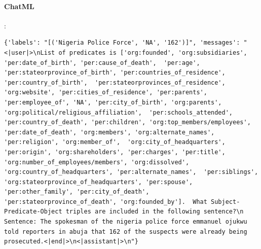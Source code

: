 \documentclass{article}
\begin{document}
\paragraph{ChatML}:
\begin{lstlisting}
{'labels': "[('Nigeria Police Force', 'NA', '162')]", 'messages': "<|user|>\nList of predicates is ['org:founded', 'org:subsidiaries', 'per:date_of_birth', 'per:cause_of_death',  'per:age', 'per:stateorprovince_of_birth', 'per:countries_of_residence', 'per:country_of_birth',  'per:stateorprovinces_of_residence', 'org:website', 'per:cities_of_residence', 'per:parents',  'per:employee_of', 'NA', 'per:city_of_birth', 'org:parents', 'org:political/religious_affiliation',  'per:schools_attended', 'per:country_of_death', 'per:children', 'org:top_members/employees',  'per:date_of_death', 'org:members', 'org:alternate_names', 'per:religion', 'org:member_of',  'org:city_of_headquarters', 'per:origin', 'org:shareholders', 'per:charges', 'per:title',  'org:number_of_employees/members', 'org:dissolved', 'org:country_of_headquarters', 'per:alternate_names',  'per:siblings', 'org:stateorprovince_of_headquarters', 'per:spouse', 'per:other_family', 'per:city_of_death',  'per:stateorprovince_of_death', 'org:founded_by'].  What Subject-Predicate-Object triples are included in the following sentence?\n Sentence: The spokesman of the nigeria police force emmanuel ojukwu told reporters in abuja that 162 of the suspects were already being prosecuted.<|end|>\n<|assistant|>\n"}
\end{lstlisting}


\end{document}
